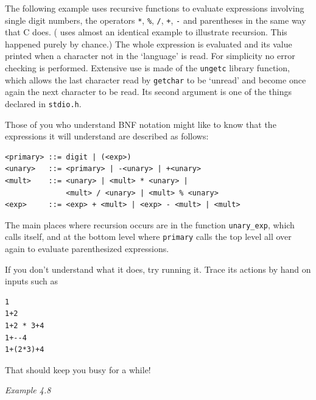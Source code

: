    The following example uses recursive functions to evaluate expressions
    involving single digit numbers, the operators \texttt{*},
    \texttt{\%}, \texttt{/}, \texttt{+}, \texttt{-} and
    parentheses in the same way that C does. (\cite{Stro} uses
    almost an identical example to illustrate recursion. This happened
    purely by chance.) The whole expression is evaluated and its value
    printed when a character not in the `language' is read. For
    simplicity no error checking is performed. Extensive use is made of the
    \texttt{ungetc} library function, which allows the last character
    read by \texttt{getchar} to be `unread' and become once again
    the next character to be read. Its second argument is one of the things
    declared in \texttt{stdio.h}.


   Those of you who understand BNF notation might like to know that the
    expressions it will understand are described as follows:

\begin{Verbatim}
<primary> ::= digit | (<exp>)
<unary>   ::= <primary> | -<unary> | +<unary>
<mult>    ::= <unary> | <mult> * <unary> |
              <mult> / <unary> | <mult> % <unary>
<exp>     ::= <exp> + <mult> | <exp> - <mult> | <mult>
\end{Verbatim}

   The main places where recursion occurs are in the function
    \texttt{unary\_exp}, which calls itself, and at the bottom level
    where \texttt{primary} calls the top level all over again to
    evaluate parenthesized expressions.


   If you don't understand what it does, try running it. Trace its
    actions by hand on inputs such as

\begin{Verbatim}
1
1+2
1+2 * 3+4
1+--4
1+(2*3)+4
\end{Verbatim}

   That should keep you busy for a while!


   \begin{center}\textit{Example 4.8}\end{center}


  


